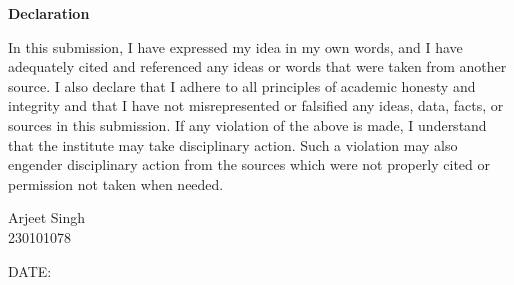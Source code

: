 \begin{flushleft}
    {\Huge\bfseries Declaration}
\end{flushleft}

\vspace{1.5cm}

In this submission, I have expressed my idea in my own words, and I have adequately cited and
referenced any ideas or words that were taken from another source. I also declare that I adhere
to all principles of academic honesty and integrity and that I have not misrepresented or falsified
any ideas, data, facts, or sources in this submission. If any violation of the above is made, I
understand that the institute may take disciplinary action. Such a violation may also engender
disciplinary action from the sources which were not properly cited or permission not taken when
needed.

\vspace{3cm}

\begin{flushright}
    Arjeet Singh\\
    230101078
\end{flushright}

\vspace{0.5cm}
\noindent DATE:

